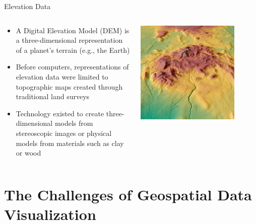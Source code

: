 \documentclass[show notes, aspectratio=1610]{beamer}
\begin{document}
\begin{frame}{Elevation Data}{}
	\begin{columns}
		\begin{column}{0.5\textwidth}
			\begin{itemize}
				\item
				      A Digital Elevation Model (DEM) is a three-dimensional
				      representation of a planet's terrain (e.g., the Earth)
				\item
				      Before computers, representations of elevation data were
				      limited to topographic maps created through traditional land
				      surveys
				\item
				      Technology existed to create three-dimensional models from
				      stereoscopic images or physical models from materials such as
				      clay or wood
			\end{itemize}
		\end{column}
		\begin{column}{0.5\textwidth}
			\centering
			\includegraphics[width=0.8\textwidth]{images/worlddem_south_province_iceland_2012.jpg}
		\end{column}
	\end{columns}
\end{frame}

\section{The Challenges of Geospatial Data Visualization}
\end{document}

